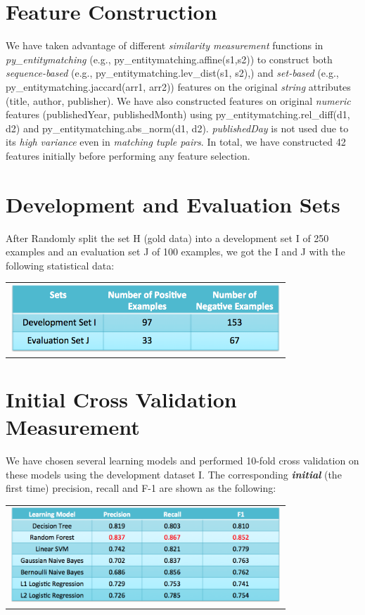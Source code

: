 \documentclass[10pt, oneside]{article}
\begin{document}
\section*{Feature Construction}
We have taken advantage of different \textit{similarity measurement} functions in \textit{py\_entitymatching} (e.g., py\_entitymatching.affine(s1,s2))
to construct both \textit{sequence-based} (e.g., py\_entitymatching.lev\_dist(s1, s2),) and \textit{set-based} (e.g., py\_entitymatching.jaccard(arr1, arr2))
features on the original \textit{string} attributes (title, author, publisher). We have also constructed features on original \textit{numeric} features 
(publishedYear, publishedMonth) using py\_entitymatching.rel\_diff(d1, d2) and py\_entitymatching.abs\_norm(d1, d2). \textit{publishedDay} is not
used due to its \textit{high variance} even in \textit{matching tuple pairs}. In total, we have constructed 42 features initially before performing any
feature selection.

\newpage

\section*{Development and Evaluation Sets}
After Randomly split the set H (gold data) into a development set I of 250 examples and an evaluation set J of 100 examples, we got the I and J
with the following statistical data:

\begin{table}[H]
\begin{tabular}{c}
\includegraphics[width=4in]{sets}
\end{tabular}
\end{table}

\section*{Initial Cross Validation Measurement}
We have chosen several learning models and performed 10-fold cross validation on these models using the development dataset I. The corresponding \textit{\textbf{initial}}
(the first time) precision, recall and F-1 are shown as the following:

\begin{table}[H]
\begin{tabular}{c}
\includegraphics[width=4in]{initial_score}
\end{tabular}
\end{table}
\end{document}
